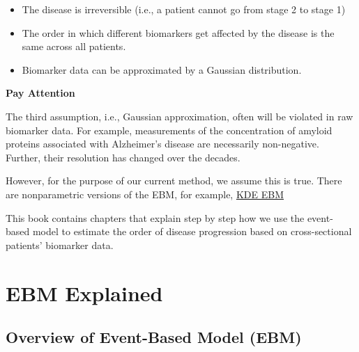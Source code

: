 \documentclass[
  letterpaper,
  DIV=11,
  numbers=noendperiod]{scrreprt}
\providecommand{\tightlist}{%
  \setlength{\itemsep}{0pt}\setlength{\parskip}{0pt}}\usepackage{longtable,booktabs,array}
\begin{document}
\begin{itemize}
\tightlist
\item
  The disease is irreversible (i.e., a patient cannot go from stage 2 to
  stage 1)
\item
  The order in which different biomarkers get affected by the disease is
  the same across all patients.
\item
  Biomarker data can be approximated by a Gaussian distribution.
\end{itemize}

\begin{tcolorbox}[enhanced jigsaw, breakable, bottomrule=.15mm, left=2mm, toprule=.15mm, colback=white, opacityback=0, arc=.35mm, colframe=quarto-callout-note-color-frame, rightrule=.15mm, leftrule=.75mm]
\begin{minipage}[t]{5.5mm}
\textcolor{quarto-callout-note-color}{\faInfo}
\end{minipage}%
\begin{minipage}[t]{\textwidth - 5.5mm}

\vspace{-3mm}\textbf{Pay Attention}\vspace{3mm}

The third assumption, i.e., Gaussian approximation, often will be
violated in raw biomarker data. For example, measurements of the
concentration of amyloid proteins associated with Alzheimer's disease
are necessarily non-negative. Further, their resolution has changed over
the decades.

However, for the purpose of our current method, we assume this is true.
There are nonparametric versions of the EBM, for example,
\href{https://github.com/ucl-pond/kde_ebm}{KDE EBM}

\end{minipage}%
\end{tcolorbox}

This book contains chapters that explain step by step how we use the
event-based model to estimate the order of disease progression based on
cross-sectional patients' biomarker data.


\chapter{EBM Explained}\label{ee}

\section{Overview of Event-Based Model
(EBM)}\label{overview-of-event-based-model-ebm}
\end{document}
